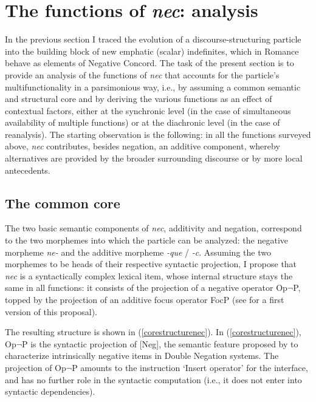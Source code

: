 \documentclass[output=paper,modfonts,nonflat,citecolor=brown,
showindex
]{langsci/langscibook}
\begin{document}
\section{The functions of {\em{nec}}: analysis} \label{sectionanalysis}

In the previous section I traced the evolution of a discourse-structuring particle into the building block of new emphatic (scalar) indefinites, which in Romance behave as elements of Negative Concord. The task of the present section is to provide an analysis of the functions of {\em{nec}} that accounts for the particle's multifunctionality in a parsimonious way, i.e., by assuming a common semantic and structural core and by deriving the various functions as an effect of contextual factors, either at the synchronic level (in the case of simultaneous availability of multiple functions) or at the diachronic level (in the case of reanalysis). The starting observation is the following: in all the functions surveyed above, {\em{nec}} contributes, besides negation, an additive component, whereby alternatives are provided by the broader surrounding discourse or by more local antecedents. 

\subsection{The common core}

The two basic semantic components of {\em{nec}}, additivity and negation, correspond to the two morphemes into which the particle can be analyzed: the negative morpheme {\em{ne-}} and the additive morpheme {\em{-que}} / {\em{-c}}. Assuming the two morphemes to be heads of their respective syntactic projection, I propose that {\em{nec}} is a syntactically complex lexical item, whose internal structure stays the same in all functions: it consists of the projection of a negative operator Op$\lnot$P, topped by the projection of an additive focus operator FocP (see \citealt[]{Gianollo17} for a first version of this proposal).

The resulting structure is shown in (\ref{corestructurenec}). In (\ref{corestructurenec}), Op$\lnot$P is the syntactic projection of [Neg], the semantic feature proposed by \citet[]{Zeijlstra04, Zeijlstra14} to characterize intrinsically negative items in Double Negation systems. The projection of Op$\lnot$P amounts to the instruction `Insert operator' for the interface, and has no further role in the syntactic computation (i.e., it does not enter into syntactic dependencies). 
\end{document}
